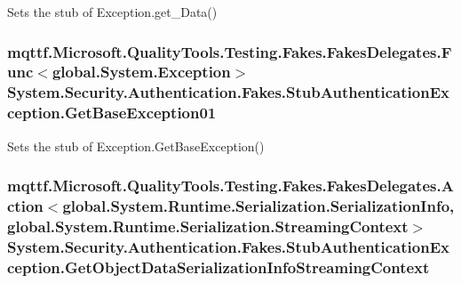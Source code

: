 Sets the stub of Exception.\-get\-\_\-\-Data()

\hypertarget{class_system_1_1_security_1_1_authentication_1_1_fakes_1_1_stub_authentication_exception_ac9cf5e81b56dfc6999b14545bd97f6bf}{
\subsubsection[{Get\-Base\-Exception01}]{\setlength{\rightskip}{0pt plus 5cm}mqttf.\-Microsoft.\-Quality\-Tools.\-Testing.\-Fakes.\-Fakes\-Delegates.\-Func$<$global.\-System.\-Exception$>$ System.\-Security.\-Authentication.\-Fakes.\-Stub\-Authentication\-Exception.\-Get\-Base\-Exception01}}\label{class_system_1_1_security_1_1_authentication_1_1_fakes_1_1_stub_authentication_exception_ac9cf5e81b56dfc6999b14545bd97f6bf}


Sets the stub of Exception.\-Get\-Base\-Exception()

\hypertarget{class_system_1_1_security_1_1_authentication_1_1_fakes_1_1_stub_authentication_exception_a91e3a7861eda263517d9158a518f2caa}{
\subsubsection[{Get\-Object\-Data\-Serialization\-Info\-Streaming\-Context}]{\setlength{\rightskip}{0pt plus 5cm}mqttf.\-Microsoft.\-Quality\-Tools.\-Testing.\-Fakes.\-Fakes\-Delegates.\-Action$<$global.\-System.\-Runtime.\-Serialization.\-Serialization\-Info, global.\-System.\-Runtime.\-Serialization.\-Streaming\-Context$>$ System.\-Security.\-Authentication.\-Fakes.\-Stub\-Authentication\-Exception.\-Get\-Object\-Data\-Serialization\-Info\-Streaming\-Context}}\label{class_system_1_1_security_1_1_authentication_1_1_fakes_1_1_stub_authentication_exception_a91e3a7861eda263517d9158a518f2caa}


